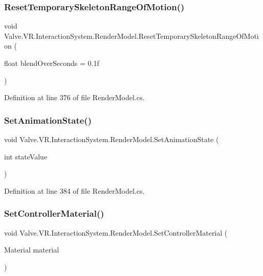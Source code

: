 \subsubsection{\texorpdfstring{ResetTemporarySkeletonRangeOfMotion()}{ResetTemporarySkeletonRangeOfMotion()}}
{\footnotesize\ttfamily void Valve.\+V\+R.\+Interaction\+System.\+Render\+Model.\+Reset\+Temporary\+Skeleton\+Range\+Of\+Motion (\begin{DoxyParamCaption}\item[{float}]{blend\+Over\+Seconds = {\ttfamily 0.1f} }\end{DoxyParamCaption})}



Definition at line 376 of file Render\+Model.\+cs.

\mbox{\label{class_valve_1_1_v_r_1_1_interaction_system_1_1_render_model_ae9e1a21abc8335c8d640fae89c6e31a8}} 
\subsubsection{\texorpdfstring{SetAnimationState()}{SetAnimationState()}}
{\footnotesize\ttfamily void Valve.\+V\+R.\+Interaction\+System.\+Render\+Model.\+Set\+Animation\+State (\begin{DoxyParamCaption}\item[{int}]{state\+Value }\end{DoxyParamCaption})}



Definition at line 384 of file Render\+Model.\+cs.

\mbox{\label{class_valve_1_1_v_r_1_1_interaction_system_1_1_render_model_a8a884caebc7343db0678ceeb326f8abc}} 
\subsubsection{\texorpdfstring{SetControllerMaterial()}{SetControllerMaterial()}}
{\footnotesize\ttfamily void Valve.\+V\+R.\+Interaction\+System.\+Render\+Model.\+Set\+Controller\+Material (\begin{DoxyParamCaption}\item[{Material}]{material }\end{DoxyParamCaption})}



